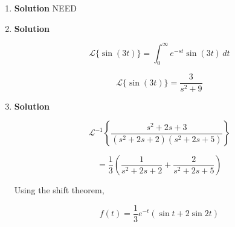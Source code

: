 \documentclass[12pt,a4paper]{article}
\begin{document}
\begin{enumerate}
\item \textbf{Solution} NEED  
\item \textbf{Solution}

\[
\mathcal L\{\sin(3t)\}
=\int_0^\infty e^{-st}\sin(3t)\,dt
\]

\[
\boxed{\mathcal L\{\sin(3t)\}=\frac{3}{s^2+9}}
\]

\item \textbf{Solution}

\[
\mathcal L^{-1}\!\left\{
\frac{s^2+2s+3}{(s^2+2s+2)(s^2+2s+5)}
\right\}
\]

\[
=\frac13\left(
\frac{1}{s^2+2s+2}
+\frac{2}{s^2+2s+5}
\right)
\]

Using the shift theorem,

\[
\boxed{
f(t)=\frac13 e^{-t}\left(\sin t+2\sin2t\right)
}
\]

\end{enumerate}
\end{document}
